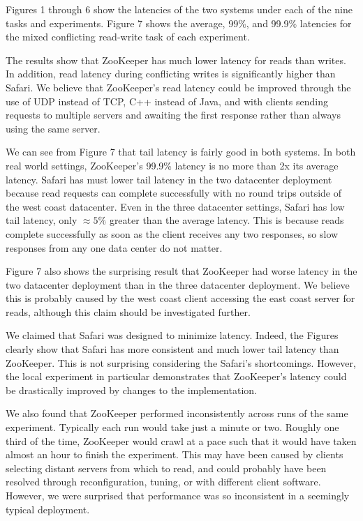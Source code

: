 Figures 1 through 6 show the latencies of the two systems under each of the nine tasks and
experiments. Figure 7 shows the average, 99\%, and 99.9\% latencies for the mixed conflicting
read-write task of each experiment.

The results show that ZooKeeper has much lower latency for reads than writes. In addition, read
latency during conflicting writes is significantly higher than Safari. We believe that ZooKeeper's
read latency could be improved through the use of UDP instead of TCP, C++ instead of Java, and with
clients sending requests to multiple servers and awaiting the first response rather than always
using the same server.

We can see from Figure 7 that tail latency is fairly good in both systems. In both real world
settings, ZooKeeper's 99.9\% latency is no more than 2x its average latency. Safari has must lower
tail latency in the two datacenter deployment because read requests can complete successfully with
no round trips outside of the west coast datacenter. Even in the three datacenter settings, Safari
has low tail latency, only $\approx 5\%$ greater than the average latency. This is because reads
complete successfully as soon as the client receives any two responses, so slow responses from any
one data center do not matter.

Figure 7 also shows the surprising result that ZooKeeper had worse latency in the two datacenter
deployment than in the three datacenter deployment. We believe this is probably caused by the west
coast client accessing the east coast server for reads, although this claim should be investigated
further.

We claimed that Safari was designed to minimize latency. Indeed, the Figures clearly show that
Safari has more consistent and much lower tail latency than ZooKeeper. This is not surprising
considering the Safari's shortcomings. However, the local experiment in particular demonstrates that
ZooKeeper's latency could be drastically improved by changes to the implementation.

We also found that ZooKeeper performed inconsistently across runs of the same experiment. Typically
each run would take just a minute or two. Roughly one third of the time, ZooKeeper would crawl at a
pace such that it would have taken almost an hour to finish the experiment. This may have been
caused by clients selecting distant servers from which to read, and could probably have been
resolved through reconfiguration, tuning, or with different client software. However, we were
surprised that performance was so inconsistent in a seemingly typical deployment.

